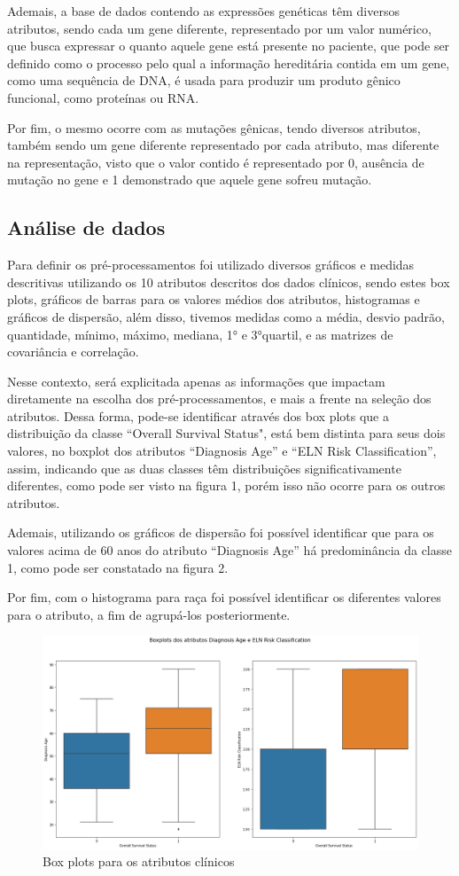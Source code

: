 \documentclass[10pt, conference, compsocconf]{IEEEtran}
\begin{document}
Ademais, a base de dados contendo as expressões genéticas têm diversos atributos, sendo cada um gene diferente, representado por um valor numérico, que busca expressar o quanto aquele gene está presente no paciente, que pode ser definido como o processo pelo qual a informação hereditária contida em um gene, como uma sequência de DNA, é usada para produzir um produto gênico funcional, como proteínas ou RNA.

Por fim, o mesmo ocorre com as mutações gênicas, tendo diversos atributos, também sendo um gene diferente representado por cada atributo, mas diferente na representação, visto que o valor contido é representado por 0, ausência de mutação no gene e 1 demonstrado que aquele gene sofreu mutação.

\subsection{Análise de dados}
Para definir os pré-processamentos foi utilizado diversos gráficos e medidas descritivas utilizando os 10 atributos descritos dos dados clínicos, sendo estes box plots, gráficos de barras para os valores médios dos atributos, histogramas e gráficos de dispersão, além disso, tivemos medidas como a média, desvio padrão, quantidade, mínimo, máximo, mediana, 1° e 3°quartil, e as matrizes de covariância e correlação.

Nesse contexto, será explicitada apenas as informações que impactam diretamente na escolha dos pré-processamentos, e mais a frente na seleção dos atributos. Dessa forma, pode-se identificar através dos box plots que a distribuição da classe “Overall Survival Status", está bem distinta para seus dois valores, no boxplot dos atributos “Diagnosis Age” e “ELN Risk Classification”, assim, indicando que as duas classes têm distribuições significativamente diferentes, como pode ser visto na figura 1, porém isso não ocorre para os outros atributos.

Ademais, utilizando os gráficos de dispersão foi possível identificar que para os valores acima de 60 anos do atributo “Diagnosis Age” há predominância da classe 1, como pode ser constatado na figura 2.

Por fim, com o histograma para raça foi possível identificar os diferentes valores para o atributo, a fim de agrupá-los posteriormente.

\begin{figure}
  \centering
  \includegraphics[width=.40\textwidth]{boxplots.png}
  \caption{Box plots para os atributos clínicos}
\label{fig:short}
\end{figure}
\end{document}
